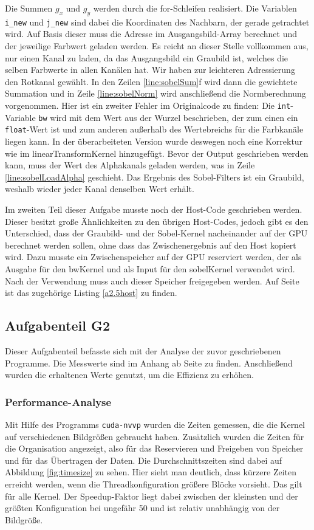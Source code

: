 \documentclass[12pt,a4paper]{scrartcl}
\begin{document}
Die Summen $g_x$ und $g_y$ werden durch die for-Schleifen realisiert.
Die Variablen \texttt{i\_new} und \texttt{j\_new} sind dabei die Koordinaten des Nachbarn, der gerade getrachtet wird.
Auf Basis dieser muss die Adresse im Ausgangsbild-Array berechnet und der jeweilige Farbwert geladen werden.
Es reicht an dieser Stelle vollkommen aus, nur einen Kanal zu laden, da das Ausgangsbild ein Graubild ist, welches die selben Farbwerte in allen Kan\"alen hat.
Wir haben zur leichteren Adressierung den Rotkanal gew\"ahlt.
In den Zeilen \ref{line:sobelSum}f wird dann die gewichtete Summation und in Zeile \ref{line:sobelNorm} wird anschlie\ss end die Normberechnung vorgenommen.
Hier ist ein zweiter Fehler im Originalcode zu finden:
Die \texttt{int}-Variable \texttt{bw} wird mit dem Wert aus der Wurzel beschrieben, der zum einen ein \texttt{float}-Wert ist und zum anderen au\ss{}erhalb des Wertebreichs f\"ur die Farbkan\"ale liegen kann.
In der \"uberarbeiteten Version wurde deswegen noch eine Korrektur wie im linearTransformKernel hinzugef\"ugt.
Bevor der Output geschrieben werden kann, muss der Wert des Alphakanals geladen werden, was in Zeile \ref{line:sobelLoadAlpha} geschieht.
Das Ergebnis des Sobel-Filters ist ein Graubild, weshalb wieder jeder Kanal denselben Wert erh\"alt.

Im zweiten Teil dieser Aufgabe musste noch der Host-Code geschrieben werden.
Dieser besitzt gro\ss{}e \"Ahnlichkeiten zu den \"ubrigen Host-Codes, jedoch gibt es den Unterschied, dass der Graubild- und der Sobel-Kernel nacheinander auf der GPU berechnet werden sollen, ohne dass das Zwischenergebnis auf den Host kopiert wird.
Dazu musste ein Zwischenspeicher auf der GPU reserviert werden, der als Ausgabe f\"ur den bwKernel und als Input f\"ur den sobelKernel verwendet wird.
Nach der Verwendung muss auch dieser Speicher freigegeben werden.
Auf Seite \pageref{a2.5host} ist das zugeh\"orige Listing \ref{a2.5host} zu finden.

\subsection{Aufgabenteil G2}
Dieser Aufgabenteil befasste sich mit der Analyse der zuvor geschriebenen Programme.
Die Messwerte sind im Anhang ab Seite \pageref{ergebnisse} zu finden.
Anschlie\ss{}end wurden die erhaltenen Werte genutzt, um die Effizienz zu erh\"ohen.

\subsubsection{Performance-Analyse}
Mit Hilfe des Programms \texttt{cuda-nvvp} wurden die Zeiten gemessen, die die Kernel auf verschiedenen Bildgr\"o\ss{}en gebraucht haben.
Zus\"atzlich wurden die Zeiten f\"ur die Organisation angezeigt, also f\"ur das Reservieren und Freigeben von Speicher und f\"ur das \"Ubertragen der Daten.
Die Durchschnittszeiten sind dabei auf Abbildung \ref{fig:timesize} zu sehen.
Hier sieht man deutlich, dass k\"urzere Zeiten erreicht werden, wenn die Threadkonfiguration gr\"o\ss{}ere Bl\"ocke vorsieht.
Das gilt f\"ur alle Kernel.
Der Speedup-Faktor liegt dabei zwischen der kleinsten und der gr\"o\ss ten Konfiguration bei ungef\"ahr 50 und ist relativ unabh\"angig von der Bildgr\"o\ss e.
\end{document}
